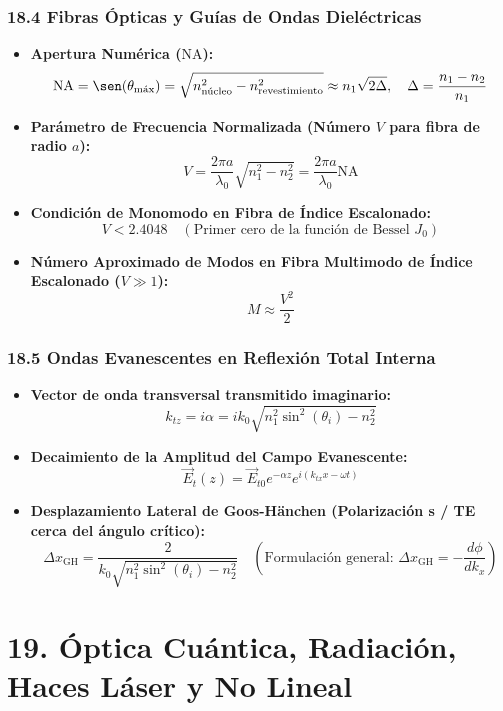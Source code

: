 \documentclass[11pt,a4paper]{article}
\begin{document}
\subsubsection*{18.4 Fibras Ópticas y Guías de Ondas Dieléctricas}

\begin{itemize}
  \item \textbf{Apertura Numérica ($\text{NA}$):}
  \[
    \text{NA} = \sen(\theta_{\text{máx}}) = \sqrt{n_{\text{núcleo}}^2 - n_{\text{revestimiento}}^2} \approx n_1 \sqrt{2\Delta}, \quad \Delta = \frac{n_1 - n_2}{n_1}
  \]
  \item \textbf{Parámetro de Frecuencia Normalizada (Número $V$ para fibra de radio $a$):}
  \[
    V = \frac{2\pi a}{\lambda_0} \sqrt{n_1^2 - n_2^2} = \frac{2\pi a}{\lambda_0} \text{NA}
  \]
  \item \textbf{Condición de Monomodo en Fibra de Índice Escalonado:}
  \[
    V < 2.4048 \quad (\text{Primer cero de la función de Bessel } J_0)
  \]
  \item \textbf{Número Aproximado de Modos en Fibra Multimodo de Índice Escalonado ($V \gg 1$):}
  \[
    M \approx \frac{V^2}{2}
  \]
\end{itemize}

\subsubsection*{18.5 Ondas Evanescentes en Reflexión Total Interna}

\begin{itemize}
  \item \textbf{Vector de onda transversal transmitido imaginario:}
  \[
    k_{tz} = i \alpha = i k_0 \sqrt{n_1^2 \sin^2(\theta_i) - n_2^2}
  \]
  \item \textbf{Decaimiento de la Amplitud del Campo Evanescente:}
  \[
    \vec{E}_t(z) = \vec{E}_{t0} e^{-\alpha z} e^{i(k_{tx} x - \omega t)}
  \]
  \item \textbf{Desplazamiento Lateral de Goos-Hänchen (Polarización s / TE cerca del ángulo crítico):}
  \[
    \Delta x_{\text{GH}} = \frac{2}{k_0 \sqrt{n_1^2 \sin^2(\theta_i) - n_2^2}} \quad \left( \text{Formulación general: } \Delta x_{\text{GH}} = -\frac{d\phi}{dk_x} \right)
  \]
\end{itemize}

\section*{19. Óptica Cuántica, Radiación, Haces Láser y No Lineal}
\end{document}

